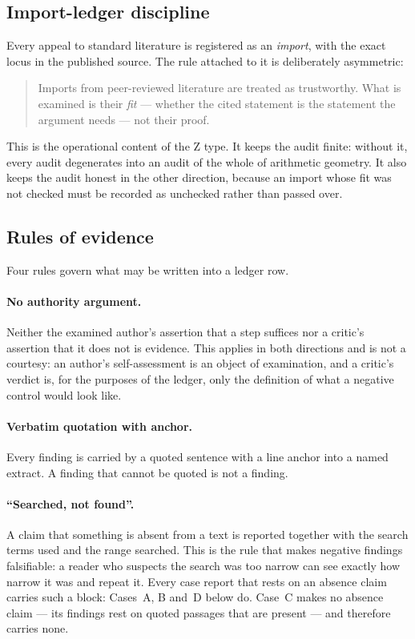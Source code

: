 \documentclass[11pt,a4paper]{article}
\theoremstyle{definition}
\begin{document}
\subsection{Import-ledger discipline}
\label{sec:importledger}

Every appeal to standard literature is registered as an \emph{import}, with the
exact locus in the published source. The rule attached to it is deliberately
asymmetric:

\begin{quote}
Imports from peer-reviewed literature are treated as trustworthy. What is
examined is their \emph{fit} --- whether the cited statement is the statement the
argument needs --- not their proof.
\end{quote}

This is the operational content of the Z type. It keeps the audit finite: without
it, every audit degenerates into an audit of the whole of arithmetic geometry. It
also keeps the audit honest in the other direction, because an import whose fit
was not checked must be recorded as unchecked rather than passed over.

\subsection{Rules of evidence}
\label{sec:evidence}

Four rules govern what may be written into a ledger row.

\paragraph{No authority argument.} Neither the examined author's assertion that a
step suffices nor a critic's assertion that it does not is evidence. This applies
in both directions and is not a courtesy: an author's self-assessment is an object
of examination, and a critic's verdict is, for the purposes of the ledger, only
the definition of what a negative control would look like.

\paragraph{Verbatim quotation with anchor.} Every finding is carried by a quoted
sentence with a line anchor into a named extract. A finding that cannot be
quoted is not a finding.

\paragraph{``Searched, not found''.} A claim that something is absent from a text
is reported together with the search terms used and the range searched. This is
the rule that makes negative findings falsifiable: a reader who suspects the
search was too narrow can see exactly how narrow it was and repeat it. Every case
report that rests on an absence claim carries such a block: Cases~A, B and~D below
do. Case~C makes no absence claim --- its findings rest on quoted passages that are
present --- and therefore carries none.
\end{document}
